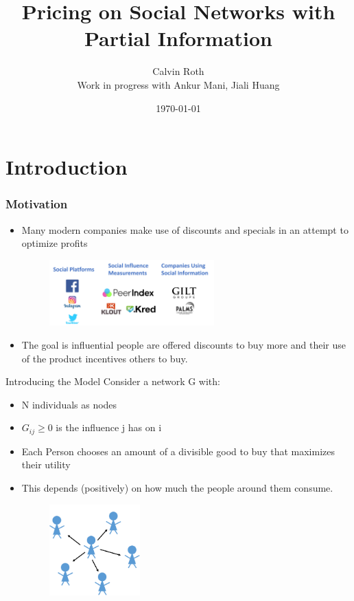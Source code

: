 \documentclass[11pt]{beamer}
\author{Calvin Roth \\  Work in progress with Ankur Mani, Jiali Huang}
\date{\today}
\title{Pricing on Social Networks with Partial Information }
\newcommand\<{\langle}
\renewcommand\>{\rangle}
\begin{document}
\begin{frame}
  \maketitle
\end{frame}
\section{Introduction}
\begin{frame}
  \frametitle{Motivation}
  \begin{itemize}
    \item Many modern companies make use of discounts and specials in an attempt to optimize profits \\
    \begin{figure}
      \centering
      \includegraphics[width=0.6\textwidth]{images/motivation.png}
    \end{figure}
   \pause
    \item The goal is influential people are offered discounts to buy more and their use of the product incentives others to buy.  \\
  \end{itemize}

\end{frame}



\begin{frame}{Introducing the Model}
  Consider a network G with:
  \begin{itemize}
    \item N individuals as nodes\\
    \item  $G_{ij} \geq 0$ is the influence j has on i \\
    \item Each Person chooses an amount of a divisible good to buy that maximizes their utility \\
    \item This depends (positively) on how much the people around them consume.
    \begin{figure}
      \centering
      \includegraphics[width=0.33\textwidth]{images/network_no_number.png}
    \end{figure}
  \end{itemize}
\end{frame}
\end{document}
